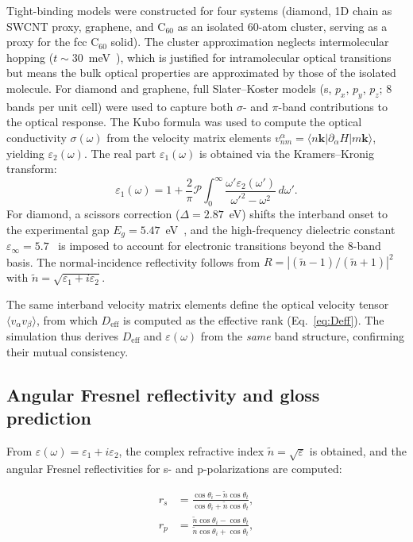 \documentclass[twocolumn,showpacs,preprintnumbers,amsmath,amssymb,prb]{revtex4-2}
\begin{document}
Tight-binding models were constructed for four systems (diamond,
1D chain as SWCNT proxy, graphene, and C$_{60}$ as an isolated
60-atom cluster, serving as a proxy for the fcc C$_{60}$ solid).
The cluster approximation neglects intermolecular hopping
($t \sim 30$~meV~\cite{Hebard1991}), which is justified for
intramolecular optical transitions but means the bulk optical
properties are approximated by those of the isolated molecule.
For diamond and graphene, full Slater--Koster models (s, $p_x$, $p_y$,
$p_z$; 8 bands per unit cell) were used to capture both $\sigma$- and
$\pi$-band contributions to the optical response.
The Kubo formula was used to compute the optical conductivity
$\sigma(\omega)$ from the velocity matrix elements
$v_{nm}^\alpha = \langle n\bm{k} | \partial_\alpha H | m\bm{k} \rangle$,
yielding $\varepsilon_2(\omega)$.
The real part $\varepsilon_1(\omega)$ is obtained via the
Kramers--Kronig transform:
\begin{equation}
  \varepsilon_1(\omega) = 1 + \frac{2}{\pi} \mathcal{P}
  \int_0^\infty \frac{\omega'\varepsilon_2(\omega')}
  {\omega'^2 - \omega^2}\, d\omega'.
  \label{eq:KK}
\end{equation}
For diamond, a scissors correction ($\Delta = 2.87$~eV)
shifts the interband onset to the experimental gap
$E_g = 5.47$~eV~\cite{Clark1964},
and the high-frequency dielectric constant
$\varepsilon_\infty = 5.7$~\cite{Palik1998} is imposed to account for
electronic transitions beyond the 8-band basis.
The normal-incidence reflectivity follows from
$R = |(\tilde{n}-1)/(\tilde{n}+1)|^2$ with
$\tilde{n} = \sqrt{\varepsilon_1 + i\varepsilon_2}$.

The same interband velocity matrix elements define the optical velocity tensor
$\langle v_\alpha v_\beta \rangle$, from which $D_\mathrm{eff}$ is
computed as the effective rank (Eq.~\ref{eq:Deff}). The simulation
thus derives $D_\mathrm{eff}$ and $\varepsilon(\omega)$ from the
\emph{same} band structure, confirming their mutual consistency.

\subsection{Angular Fresnel reflectivity and gloss prediction}

From $\varepsilon(\omega) = \varepsilon_1 + i\varepsilon_2$, the
complex refractive index $\tilde{n} = \sqrt{\varepsilon}$ is obtained,
and the angular Fresnel reflectivities for s- and p-polarizations are
computed:

\begin{align}
  r_s &= \frac{\cos\theta_i - \tilde{n}\cos\theta_t}
              {\cos\theta_i + \tilde{n}\cos\theta_t}, \label{eq:rs} \\
  r_p &= \frac{\tilde{n}\cos\theta_i - \cos\theta_t}
              {\tilde{n}\cos\theta_i + \cos\theta_t}, \label{eq:rp}
\end{align}
\end{document}

